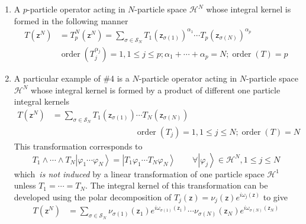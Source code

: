 \documentclass[aps,preprint]{revtex4}%
\begin{document}
\begin{enumerate}
\item A $p$-particle operator acting in $N$-particle space $\mathcal{H}^{N}$
whose integral kernel is formed in the following manner
\begin{align}
T\left(  \mathsf{z}^{N}\right)   &  =T_{p}^{N}\left(  \mathsf{z}^{N}\right)
=\sum_{\sigma\in\mathcal{S}_{N}}T_{1}\left(  \mathsf{z}_{\sigma\left(
1\right)  }\right)  ^{\alpha_{1}}\cdots T_{p}\left(  \mathsf{z}_{\sigma\left(
N\right)  }\right)  ^{\alpha_{p}}\nonumber\\
&  \operatorname{order}\left(  T_{j}^{\alpha_{j}}\right)  =1,1\leq j\leq
p;\alpha_{1}+\cdots+\alpha_{p}=N;\operatorname{order}\left(  T\right)  =p
\end{align}


\item A particular example of \#4 is a $N$-particle operator acting in
$N$-particle space $\mathcal{H}^{N}$ whose integral kernel is formed by a
product of different one particle integral kernels
\begin{align}
T\left(  \mathsf{z}^{N}\right)   &  =\sum_{\sigma\in\mathcal{S}_{N}}%
T_{1}\left(  \mathsf{z}_{\sigma\left(  1\right)  }\right)  \cdots T_{N}\left(
\mathsf{z}_{\sigma\left(  N\right)  }\right) \nonumber\\
&  \qquad\qquad\qquad\qquad\qquad\operatorname{order}\left(  T_{j}\right)
=1,1\leq j\leq N;\operatorname{order}\left(  T\right)  =N
\end{align}
This transformation corresponds to
\begin{equation}
T_{1}\wedge\cdots\wedge T_{N}\left\vert \varphi_{1}\cdots\varphi
_{N}\right\rangle =\left\vert T_{1}\varphi_{1}\cdots T_{N}\varphi
_{N}\right\rangle \qquad\forall\left\vert \varphi_{j}\right\rangle
\in\mathcal{H}^{N},1\leq j\leq N
\end{equation}
which\emph{\ is not induced }by a linear transformation of one particle space
$\mathcal{H}^{1}$ unless $T_{1}=\cdots=T_{N}$. The integral kernel of this
transformation can be developed using the polar decomposition of $T_{j}\left(
\mathsf{z}\right)  =\nu_{j}\left(  \mathsf{z}\right)  e^{i\omega_{j}\left(
\mathsf{z}\right)  }$ to give
\begin{align}
T\left(  \mathsf{z}^{N}\right)   &  =\sum_{\sigma\in\mathcal{S}_{N}}%
\nu_{\sigma\left(  1\right)  }\left(  \mathsf{z}_{1}\right)  e^{i\omega
_{\sigma\left(  1\right)  }\left(  \mathsf{z}_{1}\right)  }\cdots\nu
_{\sigma\left(  N\right)  }\left(  \mathsf{z}_{N}\right)  e^{i\omega
_{\sigma\left(  N\right)  }\left(  \mathsf{z}_{N}\right)  }\nonumber\\

\end{align}
\end{enumerate}
\end{document}
